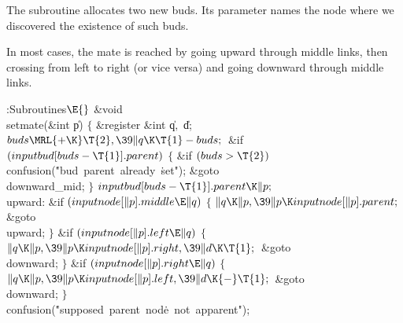 The  subroutine allocates two
new buds. Its parameter names
the node where we discovered the existence of such buds.

In most cases, the mate is reached by going upward through middle
links, then crossing from left to right (or vice versa) and going downward
through middle links.

\Y\B\4:Subroutines\X${}\E{}$\6
\&{void} \\{setmate}(\&{int} \|p)\1\1\2\2\6
${}\{{}$\1\6
\&{register} \&{int} \|q${},{}$ \|d;\7
${}\\{buds}\MRL{+{\K}}\T{2},\39\|q\K\T{1}-\\{buds};{}$\6
\&{if} ${}(\\{inputbud}[\\{buds}-\T{1}].\\{parent}){}$\5
${}\{{}$\1\6
\&{if} ${}(\\{buds}>\T{2}){}$\1\5
\\{confusion}(\.{"bud\ parent\ already\ }\)\.{set"});\2\6
\&{goto} \\{downward\_mid};\6
\4${}\}{}$\2\6
${}\\{inputbud}[\\{buds}-\T{1}].\\{parent}\K\|p;{}$\6
\4\\{upward}:\5
\&{if} ${}(\\{inputnode}[\|p].\\{middle}\E\|q){}$\5
${}\{{}$\1\6
${}\|q\K\|p,\39\|p\K\\{inputnode}[\|p].\\{parent};{}$\6
\&{goto} \\{upward};\6
\4${}\}{}$\2\6
\&{if} ${}(\\{inputnode}[\|p].\\{left}\E\|q){}$\5
${}\{{}$\1\6
${}\|q\K\|p,\39\|p\K\\{inputnode}[\|p].\\{right},\39\|d\K\T{1};{}$\6
\&{goto} \\{downward};\6
\4${}\}{}$\2\6
\&{if} ${}(\\{inputnode}[\|p].\\{right}\E\|q){}$\5
${}\{{}$\1\6
${}\|q\K\|p,\39\|p\K\\{inputnode}[\|p].\\{left},\39\|d\K{-}\T{1};{}$\6
\&{goto} \\{downward};\6
\4${}\}{}$\2\6
\\{confusion}(\.{"supposed\ parent\ nod}\)\.{e\ not\ apparent"});\6
